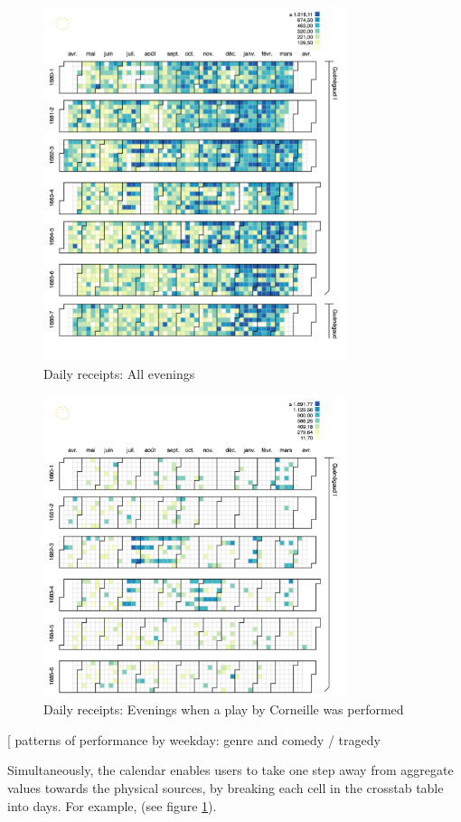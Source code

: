 \documentclass[	DIV=calc,%
							paper=a4,%
							fontsize=11pt,%
							twocolumn]{scrartcl}	 					%
\begin{document}
\begin{figure}
  \centering
	\includegraphics[width=3.5in]{steps/calendar-receipts.png}
	\caption{Daily receipts: All evenings}
	\label{fig:calendar-receipts}
\end{figure}

\begin{figure}
  \centering
	\includegraphics[width=3.5in]{steps/corneille-1680s-receipts.png}
	\caption{Daily receipts: Evenings when a play by Corneille was performed}
	\label{fig:corneille-1680s-receipts}
\end{figure}

[ patterns of performance by weekday: genre and comedy / tragedy

Simultaneously, the calendar enables users to take one step away from aggregate values towards the physical sources, by breaking each cell in the crosstab table into days.  For example, (see figure \ref{fig:calendar-receipts}).
\end{document}
